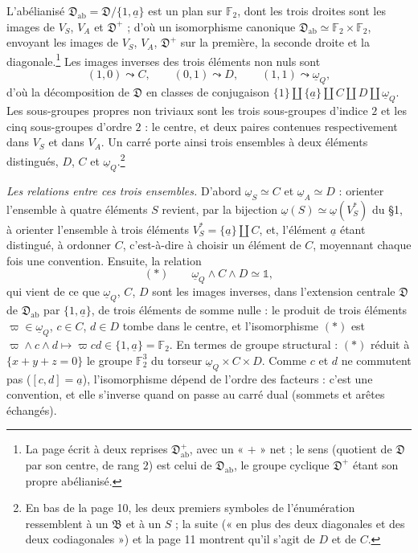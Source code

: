 \documentclass[11pt,a4paper]{article}
\begin{document}
L'abélianisé $\mathfrak{D}_{\mathrm{ab}} = \mathfrak{D}/\{1, \underline{a}\}$
est un plan sur $\mathbb{F}_2$, dont les trois droites sont les images de
$V_S$, $V_A$ et $\mathfrak{D}^{+}$ ; d'où un isomorphisme canonique
$\mathfrak{D}_{\mathrm{ab}} \simeq \mathbb{F}_2 \times \mathbb{F}_2$, envoyant
les images de $V_S$, $V_A$, $\mathfrak{D}^{+}$ sur la première, la seconde
droite et la diagonale.\footnote{La page écrit à deux reprises
$\mathfrak{D}^{+}_{\mathrm{ab}}$, avec un « $+$ » net ; le sens (quotient de
$\mathfrak{D}$ par son centre, de rang $2$) est celui de
$\mathfrak{D}_{\mathrm{ab}}$, le groupe cyclique $\mathfrak{D}^{+}$ étant son
propre abélianisé.} Les images inverses des trois éléments non nuls sont
\[
(1,0) \leadsto C, \qquad (0,1) \leadsto D, \qquad (1,1) \leadsto
\underline{\omega}_Q,
\]
d'où la décomposition de $\mathfrak{D}$ en classes de conjugaison
$\{1\} \amalg \{\underline{a}\} \amalg C \amalg D \amalg \underline{\omega}_Q$.
Les sous-groupes propres non triviaux sont les trois sous-groupes d'indice $2$
et les cinq sous-groupes d'ordre $2$ : le centre, et deux paires contenues
respectivement dans $V_S$ et dans $V_A$. Un carré porte ainsi trois ensembles
à deux éléments distingués, $D$, $C$ et $\underline{\omega}_Q$.\footnote{En
bas de la page 10, les deux premiers symboles de l'énumération ressemblent à
un $\mathfrak{B}$ et à un $S$ ; la suite (« en plus des deux diagonales et des
deux codiagonales ») et la page 11 montrent qu'il s'agit de $D$ et de $C$.}

\emph{Les relations entre ces trois ensembles.} D'abord
$\underline{\omega}_S \simeq C$ et $\underline{\omega}_A \simeq D$ : orienter
l'ensemble à quatre éléments $S$ revient, par la bijection
$\underline{\omega}(S) \simeq \underline{\omega}(V_S^{*})$ du §1, à orienter
l'ensemble à trois éléments $V_S^{*} = \{\underline{a}\} \amalg C$, et, l'élément
$\underline{a}$ étant distingué, à ordonner $C$, c'est-à-dire à choisir un
élément de $C$, moyennant chaque fois une convention. Ensuite, la relation
\[
(*) \qquad \underline{\omega}_Q \wedge C \wedge D \simeq \mathbb{1},
\]
qui vient de ce que $\underline{\omega}_Q$, $C$, $D$ sont les images inverses,
dans l'extension centrale $\mathfrak{D}$ de $\mathfrak{D}_{\mathrm{ab}}$ par
$\{1, \underline{a}\}$, de trois éléments de somme nulle : le produit de trois
éléments $\varpi \in \underline{\omega}_Q$, $c \in C$, $d \in D$ tombe dans le
centre, et l'isomorphisme $(*)$ est $\varpi \wedge c \wedge d \mapsto \varpi c d
\in \{1, \underline{a}\} = \mathbb{F}_2$. En termes de groupe structural :
$(*)$ réduit à $\{x + y + z = 0\}$ le groupe $\mathbb{F}_2^3$ du torseur
$\underline{\omega}_Q \times C \times D$. Comme $c$ et $d$ ne commutent pas
($[c, d] = \underline{a}$), l'isomorphisme dépend de l'ordre des facteurs :
c'est une convention, et elle s'inverse quand on passe au carré dual (sommets
et arêtes échangés).
\end{document}
